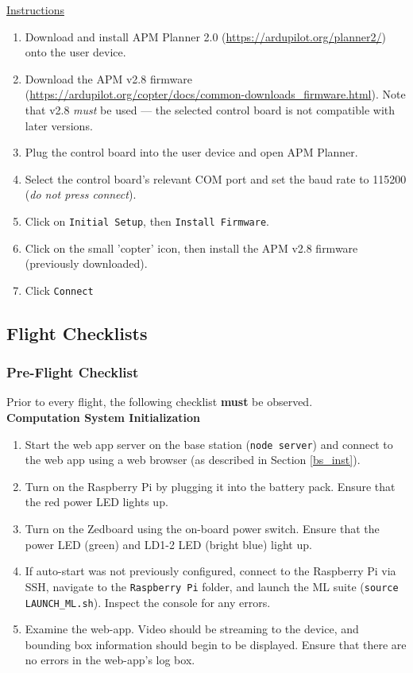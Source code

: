 \documentclass[10pt,letterpaper]{article}
\begin{document}
\underline{Instructions}

\begin{enumerate}
\item Download and install APM Planner 2.0 (\url{https://ardupilot.org/planner2/}) onto the user device.
\item Download the APM v2.8 firmware (\url{https://ardupilot.org/copter/docs/common-downloads_firmware.html}). Note that v2.8 \textit{must} be used --- the selected control board is not compatible with later versions.
\item Plug the control board into the user device and open APM Planner.
\item Select the control board's relevant COM port and set the baud rate to 115200 (\textit{do not press connect}).
\item Click on \texttt{Initial Setup}, then \texttt{Install Firmware}.
\item Click on the small 'copter' icon, then install the APM v2.8 firmware (previously downloaded).
\item Click \texttt{Connect}
\end{enumerate}

\clearpage
\subsection{Flight Checklists}
\subsubsection{Pre-Flight Checklist}
Prior to every flight, the following checklist \textbf{must} be observed.\\

\textbf{Computation System Initialization}
\begin{enumerate}
\item Start the web app server on the base station (\texttt{node server}) and connect to the web app using a web browser (as described in Section \ref{bs_inst}).
\item Turn on the Raspberry Pi by plugging it into the battery pack. Ensure that the red power LED lights up.
\item Turn on the Zedboard using the on-board power switch. Ensure that the power LED (green) and LD1-2 LED (bright blue) light up.
\item If auto-start was not previously configured, connect to the Raspberry Pi via SSH, navigate to the \texttt{Raspberry Pi} folder, and launch the ML suite (\texttt{source LAUNCH\_ML.sh}). Inspect the console for any errors.
\item Examine the web-app. Video should be streaming to the device, and bounding box information should begin to be displayed. Ensure that there are no errors in the web-app's log box.
\end{enumerate}
\end{document}
